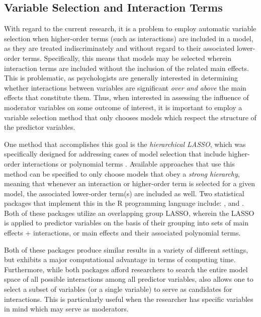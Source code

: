 \subsection{Variable Selection and Interaction Terms}
With regard to the current research, it is a problem to employ automatic variable selection when higher-order terms (such as interactions) are included in a model, as they are treated indiscriminately and without regard to their associated lower-order terms. Specifically, this means that models may be selected wherein interaction terms are included without the inclusion of the related main effects. This is problematic, as psychologists are generally interested in determining whether interactions between variables are significant \textit{over and above} the main effects that constitute them. Thus, when interested in assessing the influence of moderator variables on some outcome of interest, it is important to employ a variable selection method that only chooses models which respect the structure of the predictor variables. 

One method that accomplishes this goal is the \textit{hierarchical LASSO}, which was specifically designed for addressing cases of model selection that include higher-order interactions or polynomial terms \cite{lim2015learning,bien2013lasso}. Available approaches that use this method can be specified to only choose models that obey a \textit{strong hierarchy}, meaning that whenever an interaction or higher-order term is selected for a given model, the associated lower-order term(s) are included as well. Two statistical packages that implement this in the R programming language include:  \cite{bien2013lasso}, and  \cite{lim2015learning}. Both of these packages utilize an overlapping group LASSO, wherein the LASSO is applied to predictor variables on the basis of their grouping into sets of main effects + interactions, or main effects and their associated polynomial terms. 

Both of these packages produce similar results in a variety of different settings, but  exhibits a major computational advantage in terms of computing time. Furthermore, while both packages afford researchers to search the entire model space of all possible interactions among all predictor variables,  also allows one to select a subset of variables (or a single variable) to serve as candidates for interactions. This is particularly useful when the researcher has specific variables in mind which may serve as moderators.

